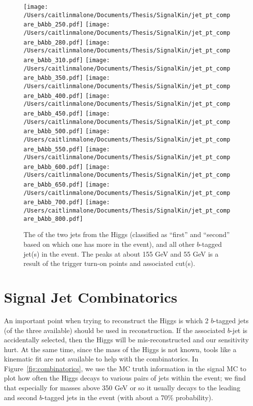 \begin{figure}[H]
    \texttt{[image: /Users/caitlinmalone/Documents/Thesis/SignalKin/jet\_pt\_compare\_bAbb\_250.pdf]}
    \texttt{[image: /Users/caitlinmalone/Documents/Thesis/SignalKin/jet\_pt\_compare\_bAbb\_280.pdf]}
    \texttt{[image: /Users/caitlinmalone/Documents/Thesis/SignalKin/jet\_pt\_compare\_bAbb\_310.pdf]}
    \newline
    \texttt{[image: /Users/caitlinmalone/Documents/Thesis/SignalKin/jet\_pt\_compare\_bAbb\_350.pdf]}
    \texttt{[image: /Users/caitlinmalone/Documents/Thesis/SignalKin/jet\_pt\_compare\_bAbb\_400.pdf]}
    \texttt{[image: /Users/caitlinmalone/Documents/Thesis/SignalKin/jet\_pt\_compare\_bAbb\_450.pdf]}
    \newline
    \texttt{[image: /Users/caitlinmalone/Documents/Thesis/SignalKin/jet\_pt\_compare\_bAbb\_500.pdf]}
    \texttt{[image: /Users/caitlinmalone/Documents/Thesis/SignalKin/jet\_pt\_compare\_bAbb\_550.pdf]}
    \texttt{[image: /Users/caitlinmalone/Documents/Thesis/SignalKin/jet\_pt\_compare\_bAbb\_600.pdf]}
    \newline
    \texttt{[image: /Users/caitlinmalone/Documents/Thesis/SignalKin/jet\_pt\_compare\_bAbb\_650.pdf]}
    \texttt{[image: /Users/caitlinmalone/Documents/Thesis/SignalKin/jet\_pt\_compare\_bAbb\_700.pdf]}
    \texttt{[image: /Users/caitlinmalone/Documents/Thesis/SignalKin/jet\_pt\_compare\_bAbb\_800.pdf]}
    \label{fig:pt_higgs_and_associated_jets}
    \caption{The \pt of the two jets from the Higgs (classified as ``first'' and ``second'' based
    on which one has more \pt in the event), and all other $b$-tagged jet(s) in the event.
    The peaks at about 155 GeV and 55 GeV is a result of the trigger turn-on points and
    associated cut(s).  }
\end{figure}


\section{Signal Jet Combinatorics}
\label{sec:combinatorics}
An important point when trying to reconstruct the Higgs is which 2 $b$-tagged jets (of the
three available) should be used in reconstruction.  If the associated $b$-jet is accidentally
selected, then the Higgs will be mis-reconstructed and our sensitivity hurt.  At the same time,
since the mass of the Higgs is not known, tools like a kinematic fit are not available to
help with the combinatorics.  In Figure~\ref{fig:combinatorics}, we use the MC truth
information in the signal MC to plot how often the Higgs decays to various pairs of jets
within the event; we find that especially for masses above 350 GeV or so it usually decays to
the leading and second $b$-tagged jets in the event (with about a 70\% probability).
    
